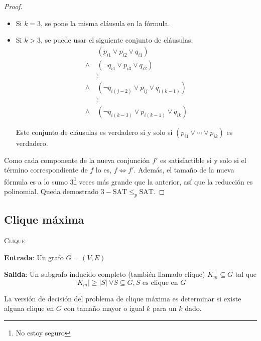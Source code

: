 \begin{proof}
\begin{itemize}
        \item Si $k = 3$, se pone la misma cláusula en la fórmula.
        \item Si $k > 3$, se puede usar el siguiente conjunto de cláusulas:
              \begin{align*}
                          & (p_{i1} \lor p_{i2} \lor q_{i1})                  \\
                  \land\  & (\neg q_{i1} \lor p_{i3} \lor q_{i2})             \\
                          & \vdots                                            \\
                  \land\  & (\neg q_{i(j - 2)} \lor p_{ij} \lor q_{i(k - 1)}) \\
                          & \vdots                                            \\
                  \land\  & (\neg q_{i(k - 3)} \lor p_{i(k - 1)} \lor q_{ik})
              \end{align*}

              Este conjunto de cláusulas es verdadero si y solo si $(p_{i1} \lor \cdots \lor p_{ik})$ es verdadero.
    \end{itemize}

    Como cada componente de la nueva conjunción $f'$ es satisfactible si y solo si el término correspondiente de $f$ lo es, $f \iff f'$. Además, el tamaño de la nueva fórmula es a lo sumo 3\footnote{No estoy seguro} veces más grande que la anterior, así que la reducción es polinomial. Queda demostrado $3-\text{SAT} \leq_p \text{SAT}$.

\end{proof}

\subsection{Clique máxima}
\label{clique}

\begin{problema}
    \textsc{Clique}
    \medskip

    \textbf{Entrada}: Un grafo $G = (V, E)$

    \textbf{Salida}: Un subgrafo inducido completo (también llamado clique) $K_m \subseteq G$ tal que
    $$|K_m| \geq |S|\ \forall S \subseteq G, S \text{ es clique en } G$$
\end{problema}

La versión de decisión del problema de clique máxima es determinar si existe alguna clique en $G$ con tamaño mayor o igual $k$ para un $k$ dado.

